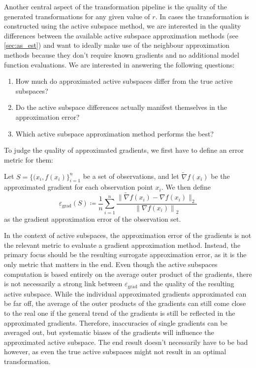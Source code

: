 \documentclass[
  a4paper,  %
  twoside,  %
  bibliography=totoc,
  headsepline,
  cleardoublepage=empty,
  parskip=half,
  draft=false
]{scrbook}
\begin{document}
Another central aspect of the transformation pipeline is the quality of the generated transformations for any given value of $r$.
In cases the transformation is constructed using the active subspace method, we are interested in the quality differences between the available active subspace approximation methods (see \cref{sec:as_est}) and want to ideally make use of the neighbour approximation methods because they don't require known gradients and no additional model function evaluations.
We are interested in answering the following questions:
\begin{enumerate}
\item How much do approximated active subspaces differ from the true active subspaces?
\item Do the active subspace differences actually manifest themselves in the approximation error?
\item Which active subspace approximation method performs the best?
\end{enumerate}
To judge the quality of approximated gradients, we first have to define an error metric for them:
\begin{definition}
Let $S=\{(x_i, f(x_i)\}_{i=1}^n$ be a set of observations, and let $\widetilde{\nabla} f(x_i)$ be the approximated gradient for each observation point $x_i$. We then define
\begin{equation}
\varepsilon_{\mathrm{grad}}(S) \coloneqq \frac{1}{n} \sum_{i=1}^n \frac{\|{\widetilde{\nabla} f(x_i) - \nabla f(x_i)}\|_2}{{\| \nabla f(x_i) \|}_2}
\label{eq:e_grad}
\end{equation}
as the gradient approximation error of the observation set.
\end{definition}
%
In the context of active subspaces, the approximation error of the gradients is not the relevant metric to evaluate a gradient approximation method.
Instead, the primary focus should be the resulting surrogate approximation error, as it is the only metric that matters in the end.
Even though the active subspaces computation is based entirely on the average outer product of the gradients, there is not necessarily a strong link between $\varepsilon_{\text{grad}}$ and the quality of the resulting active subspace.
While the individual approximated gradients approximated can be far off, the average of the outer products of the gradients can still come close to the real one if the general trend of the gradients is still be reflected in the approximated gradients.
Therefore, inaccuracies of single gradients can be averaged out, but systematic biases of the gradients will influence the approximated active subspace.
The end result doesn't necessarily have to be bad however, as even the true active subspaces might not result in an optimal transformation.
\end{document}
